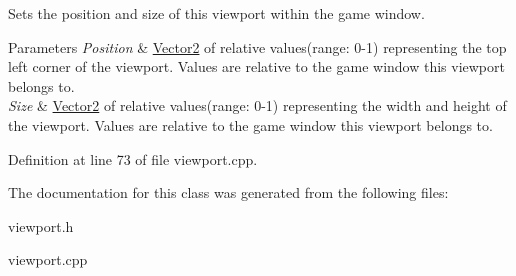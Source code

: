 Sets the position and size of this viewport within the game window. 


\begin{DoxyParams}{Parameters}
{\em Position} & \hyperlink{classMezzanine_1_1Vector2}{Vector2} of relative values(range: 0-\/1) representing the top left corner of the viewport. Values are relative to the game window this viewport belongs to. \\
\hline
{\em Size} & \hyperlink{classMezzanine_1_1Vector2}{Vector2} of relative values(range: 0-\/1) representing the width and height of the viewport. Values are relative to the game window this viewport belongs to. \\
\hline
\end{DoxyParams}


Definition at line 73 of file viewport.cpp.



The documentation for this class was generated from the following files:\begin{DoxyCompactItemize}
\item 
viewport.h\item 
viewport.cpp\end{DoxyCompactItemize}
